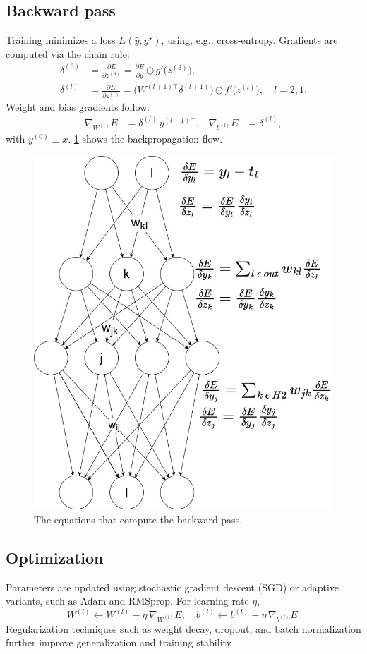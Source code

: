 \subsection{Backward pass}
Training minimizes a loss \(E(\hat y, y^\star)\), using, e.g., cross-entropy. Gradients are computed via the chain rule:
\begin{align}
\delta^{(3)} &= \frac{\partial E}{\partial z^{(3)}}
= \frac{\partial E}{\partial \hat y}\odot g'\bigl(z^{(3)}\bigr),\\
\delta^{(l)} &= \frac{\partial E}{\partial z^{(l)}}
= \bigl(W^{(l+1)\top}\delta^{(l+1)}\bigr)\odot f'\bigl(z^{(l)}\bigr),
\quad l=2,1.
\end{align}
Weight and bias gradients follow:
\begin{align}
\nabla_{W^{(l)}}E &= \delta^{(l)}\,y^{(l-1)\top}, &
\nabla_{b^{(l)}}E &= \delta^{(l)},
\end{align}
with \(y^{(0)}\equiv x\). \cref{fig:backward_pass} shows the backpropagation flow.

\begin{figure}[ht]
    \centering
    \includegraphics[width=0.6\linewidth]{figures/neural_net_back_prop.jpg}
    \caption{The equations that compute the backward pass.}
    \label{fig:backward_pass}
\end{figure}

\subsection{Optimization}
Parameters are updated using stochastic gradient descent (SGD) or adaptive variants, such as Adam and RMSprop. For learning rate \(\eta\),
\[
W^{(l)} \leftarrow W^{(l)} - \eta\,\nabla_{W^{(l)}}E,
\quad
b^{(l)} \leftarrow b^{(l)} - \eta\,\nabla_{b^{(l)}}E.
\]
Regularization techniques such as weight decay, dropout, and batch normalization further improve generalization and training stability \cite{ioffe_batch_2015}.

